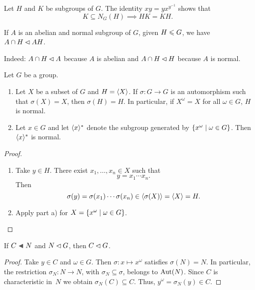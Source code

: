 \begin{rem}\label{product-is-subgroup-condition}
    Let\/ $H$ and $K$ be subgroups of\/ $G$. The identity $xy=yx^{y^{-1}}$ shows that
    $$
        K\subseteq N_G(H)\implies HK=KH.
    $$
\end{rem}

\begin{rem}\label{abelian-normal}
    If\/ $A$ is an abelian and normal subgroup of\/ $G$, given\/ $H\leqslant G$, we have\/ $A\cap H\lhd AH$.

    \textrm{\rm Indeed: $A\cap H\lhd A$ because $A$ is abelian and $A\cap H\lhd H$ because $A$ is normal.}
\end{rem}

\begin{prop}\label{normal-closure} Let $G$ be a group.
    \begin{enumerate}[\rm a)]
        \item Let $X$ be a subset of\/ $G$ and\/ $H=\langle X\rangle$. If $\sigma\colon G\to G$ is an automorphism such that $\sigma(X)=X$, then $\sigma(H)=H$. In particular, if\/ $X^\omega=X$ for all $\omega\in G$, $H$ is normal.

        \item Let $x\in G$ and let $\langle x\rangle^*$ denote the subgroup generated by $\{x^\omega\mid\omega\in G\}$. Then $\langle x\rangle^*$ is normal.
    \end{enumerate}
\end{prop}

\begin{proof}${}$
\begin{enumerate}[\rm a)]
    \item Take $y\in H$. There exist $x_1,\dots,x_n\in X$ such that
    $$
        y=x_1\cdots x_n.
    $$
    Then
    $$
        \sigma(y) = \sigma(x_1)\cdots\sigma(x_n)\in\langle\sigma(X)\rangle=\langle X\rangle=H.
    $$

    \item Apply part a) for $X=\{x^\omega\mid\omega\in G\}$. \qedhere
\end{enumerate}
\end{proof}

\begin{lem}\label{normal-transitivity}
    If $C\ch N$ and $N\lhd G$, then $C\lhd G$.
\end{lem}

\begin{proof} Take $y\in C$ and $\omega\in G$. Then $\sigma\colon x\mapsto x^\omega$ satisfies $\sigma(N)=N$. In particular, the restriction $\sigma_N\colon N\to N$, with $\sigma_N\subseteq\sigma$, belongs to ${\rm Aut}(N)$. Since $C$ is characteristic in~$N$ we obtain $\sigma_N(C)\subseteq C$. Thus, $y^\omega=\sigma_N(y)\in C$.  \end{proof}

